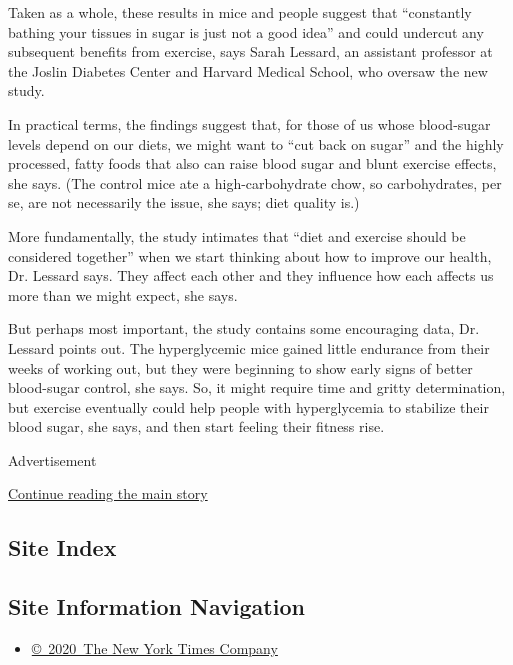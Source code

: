 Taken as a whole, these results in mice and people suggest that
``constantly bathing your tissues in sugar is just not a good idea'' and
could undercut any subsequent benefits from exercise, says Sarah
Lessard, an assistant professor at the Joslin Diabetes Center and
Harvard Medical School, who oversaw the new study.

In practical terms, the findings suggest that, for those of us whose
blood-sugar levels depend on our diets, we might want to ``cut back on
sugar'' and the highly processed, fatty foods that also can raise blood
sugar and blunt exercise effects, she says. (The control mice ate a
high-carbohydrate chow, so carbohydrates, per se, are not necessarily
the issue, she says; diet quality is.)

More fundamentally, the study intimates that ``diet and exercise should
be considered together'' when we start thinking about how to improve our
health, Dr. Lessard says. They affect each other and they influence how
each affects us more than we might expect, she says.

But perhaps most important, the study contains some encouraging data,
Dr. Lessard points out. The hyperglycemic mice gained little endurance
from their weeks of working out, but they were beginning to show early
signs of better blood-sugar control, she says. So, it might require time
and gritty determination, but exercise eventually could help people with
hyperglycemia to stabilize their blood sugar, she says, and then start
feeling their fitness rise.

Advertisement

\protect\hyperlink{after-bottom}{Continue reading the main story}

\hypertarget{site-index}{%
\subsection{Site Index}\label{site-index}}

\hypertarget{site-information-navigation}{%
\subsection{Site Information
Navigation}\label{site-information-navigation}}

\begin{itemize}
\tightlist
\item
  \href{https://help.nytimes.com/hc/en-us/articles/115014792127-Copyright-notice}{©~2020~The
  New York Times Company}
\end{itemize}

